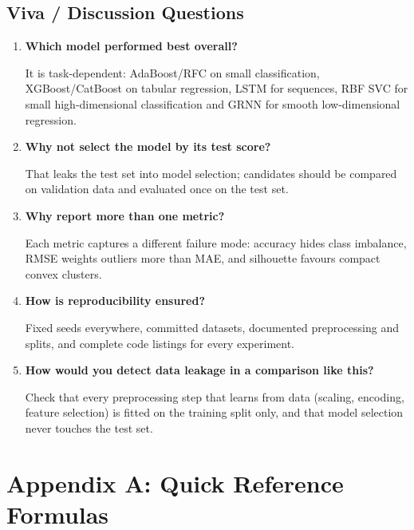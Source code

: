 \section{Viva / Discussion Questions}
\begin{enumerate}
  \item \textbf{Which model performed best overall?}\par\nobreak It is task-dependent: AdaBoost/RFC on small
  classification, XGBoost/CatBoost on tabular regression, LSTM for sequences, RBF SVC for
  small high-dimensional classification and GRNN for smooth low-dimensional regression.
  \item \textbf{Why not select the model by its test score?}\par\nobreak That leaks the test set into model
  selection; candidates should be compared on validation data and evaluated once on the test
  set.
  \item \textbf{Why report more than one metric?}\par\nobreak Each metric captures a different failure mode:
  accuracy hides class imbalance, RMSE weights outliers more than MAE, and silhouette favours
  compact convex clusters.
  \item \textbf{How is reproducibility ensured?}\par\nobreak Fixed seeds everywhere, committed datasets, documented
  preprocessing and splits, and complete code listings for every experiment.
\item \textbf{How would you detect data leakage in a comparison like this?}\par\nobreak Check that every preprocessing step that learns from data (scaling, encoding, feature selection) is fitted on the training split only, and that model selection never touches the test set.
\end{enumerate}


\chapter*{Appendix A: Quick Reference Formulas}
{}

